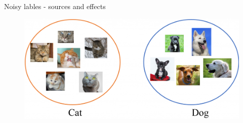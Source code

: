 \documentclass{beamer}\usepackage[]{graphicx}\usepackage[]{color}
\begin{document}
\begin{frame}[fragile]{Noisy lables - sources and effects\footnotemark[5]}
\begin{minipage}[c]{0.4\textwidth}
\begin{figure}
\end{figure}
\begin{figure}
	\includegraphics[width=0.75\linewidth]{cat_dog.png}
\end{figure}
\end{minipage}
\end{frame}
\end{document}
